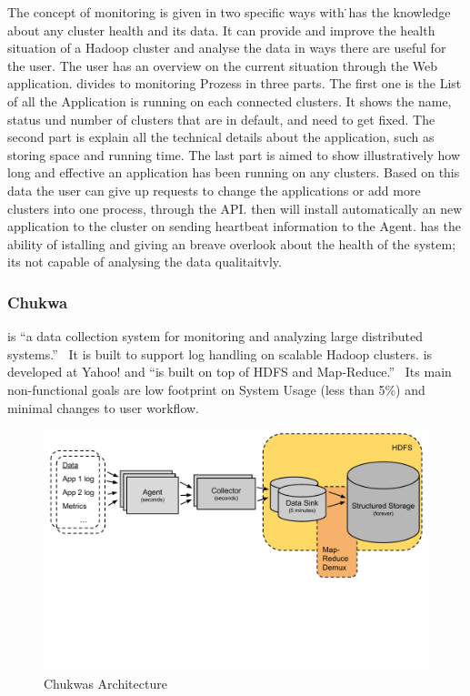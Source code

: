 The concept of monitoring is given in two specific ways with \amb\. \amb has the knowledge about any cluster health and its data. It can provide and improve the health situation of a Hadoop cluster and analyse the data in ways there are useful for the user. The user has an overview on the current situation through the Web application. \amb divides to monitoring Prozess in three parts. The first one is the List of all the Application \amb is running on each connected clusters. It shows the name, status und number of clusters that are in default, and need to get fixed. The second part is explain all the technical details about the application, such as storing space and running time. The last part is aimed to show illustratively how long and effective an application has been running on any clusters. Based on this data the user can give up requests to change the applications or add more clusters into one process, through the API. \amb then will install automatically an new application to the cluster on sending heartbeat information to the \amb Agent. \amb has the ability of istalling and giving an breave overlook about the health of the system; its not capable of analysing the data qualitaitvly.

\subsubsection{Chukwa}
\chuklong is ``a data collection system for monitoring and analyzing large distributed systems.''~\cite{Boulona}
It is built to support log handling on scalable Hadoop clusters. \chuk is developed at Yahoo! and ``is built on top of HDFS and Map-Reduce.''~\cite{Rabkin2008a}
Its main non-functional goals are low footprint on System Usage (less than 5\%) and minimal changes to user workflow.~\cite{Rabkin2010}


\begin{figure}[hbt]
  \centering
  \includegraphics[width=\linewidth,clip=true,trim=0 6cm 0 0]{images/ChukwaArchitecture}
  \caption{Chukwas Architecture~\cite{Rabkin2008}}
  \label{fig:ChukwaArchitecture}
\end{figure}
